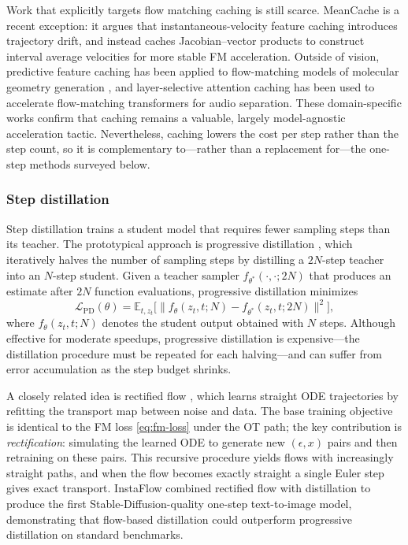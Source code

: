 Work that explicitly targets flow matching caching is still scarce. MeanCache \citep{gao2026meancache} is a recent exception: it argues that instantaneous-velocity feature caching introduces trajectory drift, and instead caches Jacobian--vector products to construct interval average velocities for more stable FM acceleration. Outside of vision, predictive feature caching has been applied to flow-matching models of molecular geometry generation \citep{sommer2025predictive}, and layer-selective attention caching has been used to accelerate flow-matching transformers for audio separation. These domain-specific works confirm that caching remains a valuable, largely model-agnostic acceleration tactic. Nevertheless, caching lowers the cost per step rather than the step count, so it is complementary to---rather than a replacement for---the one-step methods surveyed below.

\subsubsection{Step distillation}

Step distillation trains a student model that requires fewer sampling steps than its teacher. The prototypical approach is progressive distillation \citep{salimans2022progressive}, which iteratively halves the number of sampling steps by distilling a $2N$-step teacher into an $N$-step student. Given a teacher sampler $f_{\theta^*}(\cdot, \cdot; 2N)$ that produces an estimate after $2N$ function evaluations, progressive distillation minimizes
\begin{equation}
    \mathcal{L}_{\text{PD}}(\theta) = \mathbb{E}_{t, z_t} \Big[ \big\| f_\theta(z_t, t; N) - f_{\theta^*}(z_t, t; 2N) \big\|^2 \Big],
    \label{eq:progressive-distillation}
\end{equation}
where $f_\theta(z_t, t; N)$ denotes the student output obtained with $N$ steps. Although effective for moderate speedups, progressive distillation is expensive---the distillation procedure must be repeated for each halving---and can suffer from error accumulation as the step budget shrinks.

A closely related idea is rectified flow \citep{liu2022rectified}, which learns straight ODE trajectories by refitting the transport map between noise and data. The base training objective is identical to the FM loss \cref{eq:fm-loss} under the OT path; the key contribution is \emph{rectification}: simulating the learned ODE to generate new $(\epsilon, x)$ pairs and then retraining on these pairs. This recursive procedure yields flows with increasingly straight paths, and when the flow becomes exactly straight a single Euler step gives exact transport. InstaFlow \citep{liu2023instaflow} combined rectified flow with distillation to produce the first Stable-Diffusion-quality one-step text-to-image model, demonstrating that flow-based distillation could outperform progressive distillation on standard benchmarks.

